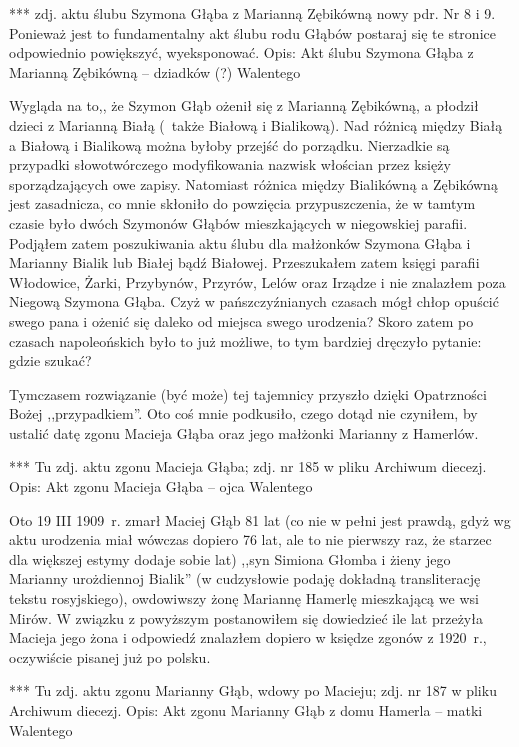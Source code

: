 {\color{red}
*** zdj. aktu ślubu Szymona Głąba z Marianną Zębikówną  nowy pdr. Nr 8 i 9. Ponieważ jest to fundamentalny akt ślubu rodu Głąbów postaraj się te stronice odpowiednio powiększyć, wyeksponować.
Opis: Akt ślubu Szymona Głąba z Marianną Zębikówną -- dziadków (?) Walentego }

Wygląda na to,, że Szymon Głąb ożenił się z Marianną Zębikówną, a płodził dzieci z Marianną Białą (~także Białową i Bialikową). Nad różnicą między Białą a Białową i Bialikową można byłoby przejść do porządku. Nierzadkie są przypadki słowotwórczego modyfikowania nazwisk włościan przez księży sporządzających owe zapisy. Natomiast różnica między Bialikówną a Zębikówną jest zasadnicza, co mnie skłoniło do powzięcia przypuszczenia, że w tamtym czasie było dwóch Szymonów Głąbów mieszkających w niegowskiej parafii. Podjąłem zatem poszukiwania aktu ślubu dla małżonków Szymona Głąba i Marianny Bialik lub Białej bądź Białowej. Przeszukałem zatem księgi parafii Włodowice, Żarki, Przybynów, Przyrów, Lelów oraz Irządze i nie znalazłem poza Niegową Szymona Głąba. Czyż w pańszczyźnianych czasach mógł chłop opuścić swego pana i ożenić się daleko od miejsca swego urodzenia? Skoro zatem po czasach napoleońskich było to już możliwe, to tym bardziej dręczyło pytanie: gdzie szukać? 

Tymczasem rozwiązanie (być może) tej tajemnicy przyszło dzięki Opatrzności Bożej ,,przypadkiem''. Oto coś mnie podkusiło, czego dotąd nie czyniłem, by ustalić datę zgonu Macieja Głąba oraz jego małżonki Marianny z Hamerlów.

{\color{red}
*** Tu zdj. aktu zgonu Macieja Głąba; zdj. nr 185 w pliku Archiwum diecezj.
Opis: Akt zgonu Macieja Głąba -- ojca Walentego }

Oto 19 III 1909~r. zmarł Maciej Głąb 81 lat (co nie w pełni jest prawdą, gdyż wg aktu urodzenia miał wówczas dopiero 76 lat, ale to nie pierwszy raz, że starzec dla większej estymy dodaje sobie lat) ,,syn Simiona Głomba i żieny jego Marianny urożdiennoj Bialik'' (w cudzysłowie podaję dokładną transliterację tekstu rosyjskiego), owdowiwszy żonę Mariannę Hamerlę mieszkającą we wsi Mirów.
W związku z powyższym postanowiłem się dowiedzieć ile lat przeżyła Macieja jego żona i odpowiedź znalazłem dopiero w księdze zgonów z 1920~r., oczywiście pisanej już po polsku.

{\color{red}
*** Tu zdj. aktu zgonu Marianny Głąb, wdowy po Macieju; zdj. nr 187 w pliku Archiwum diecezj.
Opis: Akt zgonu Marianny Głąb z domu Hamerla -- matki Walentego }

